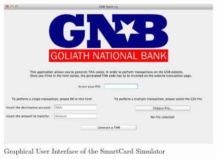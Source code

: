 \begin{figure}[h!tbp]
	\centering
	\includegraphics[width=\textwidth]{figures/scs_gui.png}
	\caption{Graphical User Interface of the SmartCard Simulator}
	\label{figure:scs_gui}
\end{figure}

